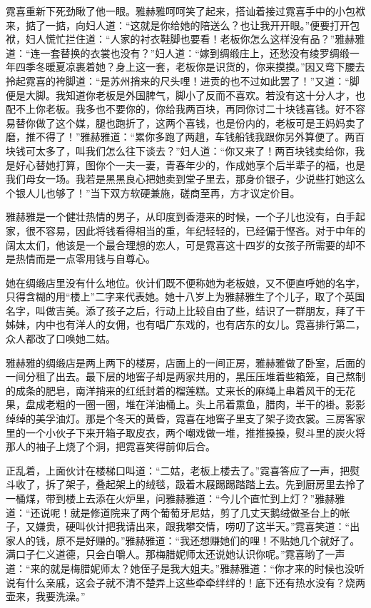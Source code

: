 \par 霓喜重新下死劲瞅了他一眼。雅赫雅呵呵笑了起来，搭讪着接过霓喜手中的小包袱来，掂了一掂，向妇人道：“这就是你给她的陪送么？也让我开开眼。”便要打开包袱，妇人慌忙拦住道：“人家的衬衣鞋脚也要看！老板你怎么这样没有品？”雅赫雅道：“连一套替换的衣裳也没有？”妇人道：“嫁到绸缎庄上，还愁没有绫罗绸缎一年四季冬暖夏凉裹着她？身上这一套，老板你是识货的，你来摸摸。”因又弯下腰去拎起霓喜的袴脚道：“是苏州捎来的尺头哩！进贡的也不过如此罢了！”又道：“脚便是大脚。我知道你老板是外国脾气，脚小了反而不喜欢。若没有这十分人才，也配不上你老板。我多也不要你的，你给我两百块，再同你讨二十块钱喜钱。好不容易替你做了这个媒，腿也跑折了，这两个喜钱，也是份内的，老板可是王妈妈卖了磨，推不得了！”雅赫雅道：“累你多跑了两趟，车钱船钱我跟你另外算便了。两百块钱可太多了，叫我们怎么往下谈去？”妇人道：“你又来了！两百块钱卖给你，我是好心替她打算，图你个一夫一妻，青春年少的，作成她享个后半辈子的福，也是我们母女一场。我若是黑黑良心把她卖到堂子里去，那身价银子，少说些打她这么个银人儿也够了！”当下双方软硬兼施，磋商至再，方才议定价目。
\par 雅赫雅是一个健壮热情的男子，从印度到香港来的时候，一个子儿也没有，白手起家，很不容易，因此将钱看得相当的重，年纪轻轻的，已经偏于悭吝。对于中年的阔太太们，他该是一个最合理想的恋人，可是霓喜这十四岁的女孩子所需要的却不是热情而是一点零用钱与自尊心。
\par 她在绸缎店里没有什么地位。伙计们既不便称她为老板娘，又不便直呼她的名字，只得含糊的用“楼上”二字来代表她。她十八岁上为雅赫雅生了个儿子，取了个英国名字，叫做吉美。添了孩子之后，行动上比较自由了些，结识了一群朋友，拜了干姊妹，内中也有洋人的女佣，也有唱广东戏的，也有店东的女儿。霓喜排行第二，众人都改了口唤她二姑。
\par 雅赫雅的绸缎店是两上两下的楼房，店面上的一间正房，雅赫雅做了卧室，后面的一间分租了出去。最下层的地窖子却是两家共用的，黑压压堆着些箱笼，自己熬制的成条的肥皂，南洋捎来的红纸封着的榴莲糕。丈来长的麻绳上串着风干的无花果，盘成老粗的一圈一圈，堆在洋油桶上。头上吊着熏鱼，腊肉，半干的褂。影影绰绰的美孚油灯。那是个冬天的黄昏，霓喜在地窖子里支了架子烫衣裳。三房客家里的一个小伙子下来开箱子取皮衣，两个嘲戏做一堆，推推搡搡，熨斗里的炭火将那人的袖子上烧了个洞，把霓喜笑得前仰后合。
\par 正乱着，上面伙计在楼梯口叫道：“二姑，老板上楼去了。”霓喜答应了一声，把熨斗收了，拆了架子，叠起架上的绒毯，趿着木屐踢踢踏踏上去。先到厨房里去拎了一桶煤，带到楼上去添在火炉里，问雅赫雅道：“今儿个直忙到上灯？”雅赫雅道：“还说呢！就是修道院来了两个葡萄牙尼姑，剪了几丈天鹅绒做圣台上的帐子，又嫌贵，硬叫伙计把我请出来，跟我攀交情，唠叨了这半天。”霓喜笑道：“出家人的钱，原不是好赚的。”雅赫雅道：“我还想赚她们的哩！不贴她几个就好了。满口子仁义道德，只会白嚼人。那梅腊妮师太还说她认识你呢。”霓喜哟了一声道：“来的就是梅腊妮师太？她侄子是我大姐夫。”雅赫雅道：“你才来的时候也没听说有什么亲戚，这会子就不清不楚弄上这些牵牵绊绊的！底下还有热水没有？烧两壶来，我要洗澡。”

